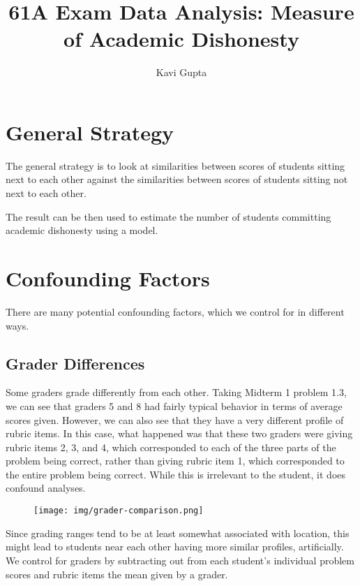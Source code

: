 \documentclass{article}
\begin{document}
    \author{Kavi Gupta}
    \title{61A Exam Data Analysis: Measure of Academic Dishonesty}
    \maketitle

\section{General Strategy}
    The general strategy is to look at similarities between scores of students sitting next to each
        other against the similarities between scores of students sitting not next to each other.

    The result can be then used to estimate the number of students committing academic dishonesty
        using a model.

\section{Confounding Factors}
    There are many potential confounding factors, which we control for in different ways.
    \subsection{Grader Differences}
        Some graders grade differently from each other. Taking Midterm 1 problem 1.3, we can see that
            graders 5 and 8 had fairly typical behavior in terms of average scores given. However, we can
            also see that they have a very different profile of rubric items. In this case, what happened
            was that these two graders were giving rubric items 2, 3, and 4, which corresponded to each of
            the three parts of the problem being correct, rather than giving rubric item 1, which
            corresponded to the entire problem being correct. While this is irrelevant to the student, it
            does confound analyses.

        \begin{figure}[h!]
            \centering
            \texttt{[image: img/grader-comparison.png]}
        \end{figure}

        Since grading ranges tend to be at least somewhat associated with location, this might lead to
            students near each other having more similar profiles, artificially. We control for graders
            by subtracting out from each student's individual problem scores and rubric items the mean
            given by a grader.
\end{document}
